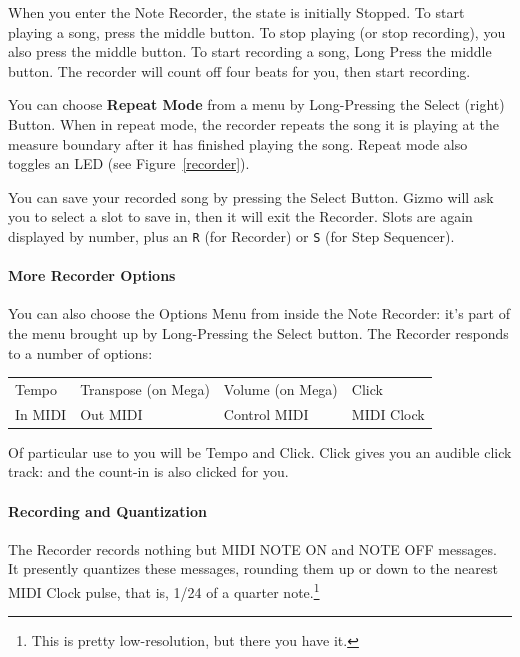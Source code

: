 \documentclass{article}
\begin{document}
When you enter the Note Recorder, the state is initially Stopped.  To start playing a song, press the middle button.  To stop playing (or stop recording), you also press the middle button.  To start recording a song, Long Press the middle button.  The recorder will count off four beats for you, then start recording.

You can choose {\bf Repeat Mode} from a menu by Long-Pressing the Select (right) Button.  When in repeat mode, the recorder repeats the song it is playing at the measure boundary after it has finished playing the song.  Repeat mode also toggles an LED (see Figure~\ref{recorder}).

You can save your recorded song by pressing the Select Button.  Gizmo will ask you to select a slot to save in, then it will exit the Recorder.  Slots are again displayed by number, plus an \texttt{R} (for Recorder) or \texttt{S} (for Step Sequencer).

\paragraph{More Recorder Options}  
You can also choose the Options Menu from inside the Note Recorder: it's part of the menu brought up by Long-Pressing the Select button.  The Recorder responds to a number of options:

\vspace{1em}
\begin{tabular}{llll}
Tempo&Transpose (on Mega)&Volume (on Mega)&Click\\
In MIDI& Out MIDI&Control MIDI&MIDI Clock\\
\end{tabular}

\vspace{1em}
Of particular use to you will be Tempo and Click.  Click gives you an audible click track: and the count-in is also clicked for you.

\paragraph{Recording and Quantization}

The Recorder records nothing but MIDI NOTE ON and NOTE OFF messages.  It presently quantizes these messages, rounding them up or down to the nearest MIDI Clock pulse, that is, 1/24 of a quarter note.\footnote{This is pretty low-resolution, but there you have it.}

\clearpage
\end{document}
